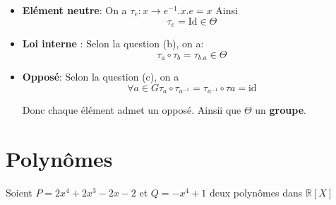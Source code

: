 \documentclass[12pt,a4paper,dvipsnames]{article}
\begin{document}
\begin{description}
    \begin{itemize}
        \item  \textbf{Elément neutre}: On a $\tau_{e}: x \rightarrow e^{-1}.x.e=x$
            Ainsi $$\tau_e = \text{Id} \in \Theta$$
        \item \textbf{Loi interne} : Selon la question (b), on a:
            $$
            \tau_a \circ \tau_b = \tau_{b.a}  \in \Theta
            $$

        \item \textbf{Opposé}: Selon la question (c), on a
            $$
             \forall a\in G \tau_a\circ\tau_{a^{-1}} =
            \tau_{a^{-1}}\circ\tau{a}= \text{id}
            $$

Donc chaque élément admet un opposé.
Ainsii que $\Theta$ un \textbf{groupe}.
    \end{itemize}


\end{description}
\section{Polynômes}%
\label{sec:polynomes}

Soient $P= 2x^4 + 2x^3 -2x -2$ et $Q=-x^4 + 1$ deux polynômes dans $\mathbb{R}[X]$
\end{document}
